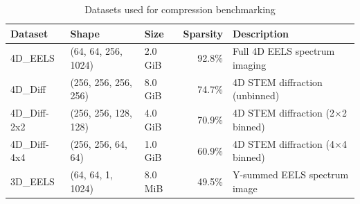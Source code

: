 \begin{table}[h]
\centering
\caption{Datasets used for compression benchmarking}
\label{tab:datasets}
\begin{tabular}{lllrl}
\hline
\textbf{Dataset} & \textbf{Shape} & \textbf{Size} & \textbf{Sparsity} & \textbf{Description} \\
\hline
4D\_EELS & (64, 64, 256, 1024) & 2.0 GiB & 92.8\% & Full 4D EELS spectrum imaging \\
4D\_Diff & (256, 256, 256, 256) & 8.0 GiB & 74.7\% & 4D STEM diffraction (unbinned) \\
4D\_Diff-2x2 & (256, 256, 128, 128) & 4.0 GiB & 70.9\% & 4D STEM diffraction (2$\times$2 binned) \\
4D\_Diff-4x4 & (256, 256, 64, 64) & 1.0 GiB & 60.9\% & 4D STEM diffraction (4$\times$4 binned) \\
3D\_EELS & (64, 64, 1, 1024) & 8.0 MiB & 49.5\% & Y-summed EELS spectrum image \\
\hline
\end{tabular}
\end{table}
